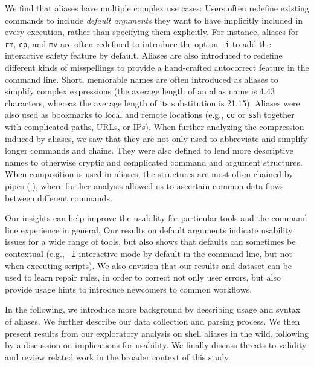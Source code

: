 We find that aliases have multiple complex use cases:
Users often redefine existing commands to include \emph{default arguments} they want to have implicitly included in every execution, rather than specifying them explicitly.
For instance, aliases for \verb|rm|, \verb|cp|, and \verb|mv| are often redefined to introduce the option \verb|-i| to add the interactive safety feature by default.
Aliases are also introduced to redefine different kinds of misspellings to provide a hand-crafted autocorrect feature in the command line. 
Short, memorable names are often introduced as aliases to simplify complex expressions (the average length of an alias name is 4.43 characters, whereas the average length of its substitution is 21.15).
Aliases were also used as bookmarks to local and remote locations (e.g., \verb|cd| or \verb|ssh| together with complicated paths, URLs, or IPs).
When further analyzing the compression induced by aliases, we saw that they are not only used to abbreviate and simplify longer commands and chains.
They were also defined to lend more descriptive names to otherwise cryptic and complicated command and argument structures.
When composition is used in aliases, the structures are most often chained by pipes (\verb|||), where further analysis allowed us to ascertain common data flows between different commands.

Our insights can help improve the usability for particular tools and the command line experience in general.
Our results on default arguments indicate usability issues for a wide range of tools, but also shows that defaults can sometimes be contextual (e.g., \verb|-i| interactive mode by default in the command line, but not when executing scripts).
We also envision that our results and dataset can be used to learn repair rules, in order to correct not only user errors, but also provide usage hints to introduce newcomers to common workflows.

In the following, we introduce more background by describing usage and syntax of aliases. We further describe our data collection and parsing process. We then present results from our exploratory analysis on shell aliases in the wild, following by a discussion on implications for usability. We finally discuss threats to validity and review related work in the broader context of this study. 